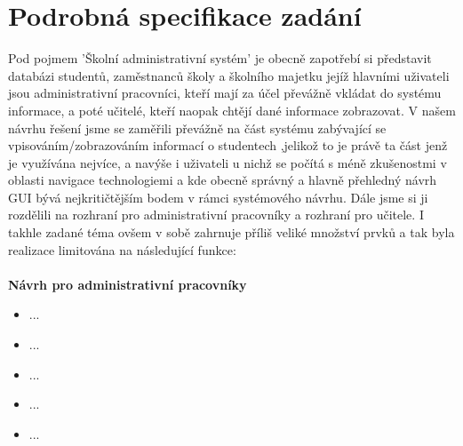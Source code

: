 \documentclass[a4paper, 11pt, twocolumn]{article}
\begin{document}
	\section*{\large{Podrobná specifikace zadání}}
	\vspace*{-0.2cm}
	Pod pojmem 'Školní administrativní systém' je obecně zapotřebí si představit databázi studentů, zaměstnanců školy a školního majetku jejíž hlavními 
	uživateli jsou administrativní pracovníci, kteří mají za účel převážně vkládat do systému informace, a poté učitelé, kteří naopak chtějí dané informace 
	zobrazovat. V našem návrhu řešení jsme se zaměřili převážně na část systému zabývající se vpisováním/zobrazováním informací o studentech ,jelikož to je 
	právě ta část jenž je využívána nejvíce, a navýše i uživateli u nichž se počítá s méně zkušenostmi v oblasti navigace technologiemi a kde obecně správný a 
	hlavně přehledný návrh GUI bývá nejkritičtějším bodem v rámci systémového návrhu. Dále jsme si ji rozdělili na rozhraní pro administrativní pracovníky a 
	rozhraní pro učitele. I takhle zadané téma ovšem v sobě zahrnuje příliš veliké množství prvků a tak byla realizace limitována na následující funkce: \\
	\vspace*{0.2cm} \\
	\noindent\textbf{Návrh pro administrativní pracovníky} 
	\begin{itemize}
		\item ...
		\vspace{-0.2cm}
		\item ...
		\vspace{-0.2cm}
		\item ...
		\vspace{-0.2cm}
		\item ...
		\vspace{-0.2cm}
		\item ...
	\end{itemize}
	\vspace*{0.2cm}
\end{document}
